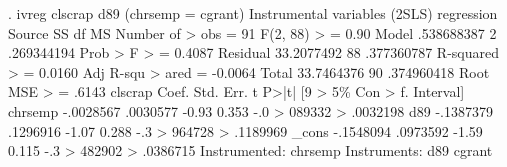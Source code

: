 . ivreg clscrap d89 (chrsemp = cgrant)
{\smallskip}
Instrumental variables (2SLS) regression
{\smallskip}
      Source {\VBAR}       SS           df       MS      Number of
>  obs   =        91
   F(2, 88) 
>        =      0.90
       Model {\VBAR}  .538688387         2  .269344194   Prob > F 
>        =    0.4087
    Residual {\VBAR}  33.2077492        88  .377360787   R-squared
>        =    0.0160
   Adj R-squ
> ared   =   -0.0064
       Total {\VBAR}  33.7464376        90  .374960418   Root MSE 
>        =     .6143
{\smallskip}
     clscrap {\VBAR}      Coef.   Std. Err.      t    P>|t|     [9
> 5\% Con                                                    
>       f. Interval]
     chrsemp {\VBAR}  -.0028567   .0030577    -0.93   0.353    -.0
> 089332                                                    
>           .0032198
         d89 {\VBAR}  -.1387379   .1296916    -1.07   0.288    -.3
> 964728                                                    
>           .1189969
       _cons {\VBAR}  -.1548094   .0973592    -1.59   0.115    -.3
> 482902                                                    
>           .0386715
Instrumented:  chrsemp
Instruments:   d89 cgrant
{\smallskip}
